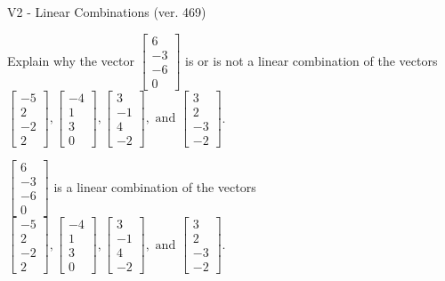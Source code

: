 \begin{exercise}
  \begin{exerciseTitle}V2 - Linear Combinations (ver. 469)\end{exerciseTitle}
  \begin{exerciseStatement}
    Explain why the vector \(\left[\begin{array}{c}
6 \\
-3 \\
-6 \\
0
\end{array}\right]\)  is or is not a linear 
	combination of the vectors \(\left[\begin{array}{c}
-5 \\
2 \\
-2 \\
2
\end{array}\right] , \left[\begin{array}{c}
-4 \\
1 \\
3 \\
0
\end{array}\right] , \left[\begin{array}{c}
3 \\
-1 \\
4 \\
-2
\end{array}\right] , \text{ and } \left[\begin{array}{c}
3 \\
2 \\
-3 \\
-2
\end{array}\right]\).
	


  \end{exerciseStatement}
  \begin{exerciseAnswer}
   \(\left[\begin{array}{c}
6 \\
-3 \\
-6 \\
0
\end{array}\right]\) 
  	 is  
	a linear combination of the vectors \(\left[\begin{array}{c}
-5 \\
2 \\
-2 \\
2
\end{array}\right] , \left[\begin{array}{c}
-4 \\
1 \\
3 \\
0
\end{array}\right] , \left[\begin{array}{c}
3 \\
-1 \\
4 \\
-2
\end{array}\right] , \text{ and } \left[\begin{array}{c}
3 \\
2 \\
-3 \\
-2
\end{array}\right]\).


\end{exerciseAnswer}
\end{exercise}
